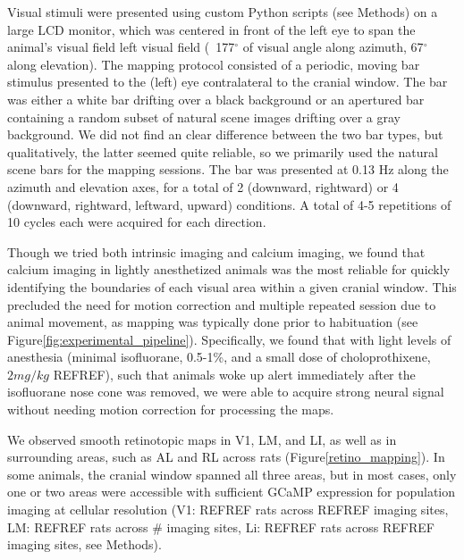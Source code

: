 Visual stimuli were presented using custom Python scripts (see Methods) on a large LCD monitor, which was centered in front of the left eye to span the animal's visual field left visual field (~177$^{\circ}$ of visual angle along azimuth, 67$^{\circ}$ along elevation). The mapping protocol consisted of a periodic, moving bar stimulus\cite{Kalatsky2003, Marshel2011} presented to the (left) eye contralateral to the cranial window. The bar was either a white bar drifting over a black background or an apertured bar containing a random subset of natural scene images drifting over a gray background. We did not find an clear difference between the two bar types, but qualitatively, the latter seemed quite reliable, so we primarily used the natural scene bars for the mapping sessions. The bar was presented at 0.13 Hz along the azimuth and elevation axes, for a total of 2 (downward, rightward) or 4 (downward, rightward, leftward, upward) conditions. A total of 4-5 repetitions of 10 cycles each were acquired for each direction. 

Though we tried both intrinsic imaging and calcium imaging, we found that calcium imaging in lightly anesthetized animals was the most reliable for quickly identifying the boundaries of each visual area within a given cranial window. This precluded the need for motion correction and multiple repeated session due to animal movement, as mapping was typically done prior to habituation (see Figure\ref{fig:experimental_pipeline}). Specifically, we found that with light levels of anesthesia (minimal isofluorane, 0.5-1\%, and a small dose of choloprothixene, $2mg/kg$ REFREF), such that animals woke up alert immediately after the isofluorane nose cone was removed, we were able to acquire strong neural signal without needing motion correction for processing the maps.

We observed smooth retinotopic maps in  V1, LM, and LI, as well as in surrounding areas, such as AL and RL across rats (Figure\ref{retino_mapping}). In some animals, the cranial window spanned all three areas, but in most cases, only one or two areas were accessible with sufficient GCaMP expression for population imaging at cellular resolution (V1: REFREF rats across REFREF imaging sites, LM: REFREF rats across # imaging sites, Li: REFREF rats across REFREF imaging sites, see Methods).

